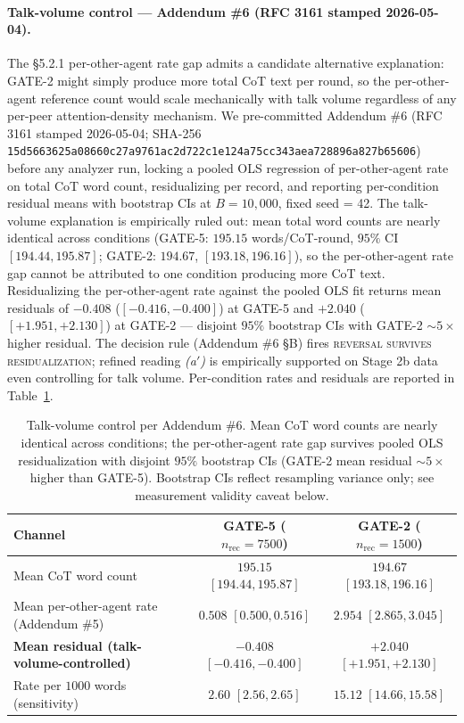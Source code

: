 \paragraph{Talk-volume control --- Addendum \#6 (RFC 3161 stamped 2026-05-04).}
The §5.2.1 per-other-agent rate gap admits a candidate alternative explanation: GATE-2 might simply produce more total CoT text per round, so the per-other-agent reference count would scale mechanically with talk volume regardless of any per-peer attention-density mechanism. We pre-committed Addendum \#6 (RFC 3161 stamped 2026-05-04; SHA-256 \texttt{15d5663625a08660c27a9761ac2d722c1e124a75cc343aea728896a827b65606}) before any analyzer run, locking a pooled OLS regression of per-other-agent rate on total CoT word count, residualizing per record, and reporting per-condition residual means with bootstrap CIs at $B = 10{,}000$, fixed seed = 42. The talk-volume explanation is empirically ruled out: mean total word counts are nearly identical across conditions (GATE-5: $195.15$ words/CoT-round, $95\%$ CI $[194.44, 195.87]$; GATE-2: $194.67$, $[193.18, 196.16]$), so the per-other-agent rate gap cannot be attributed to one condition producing more CoT text. Residualizing the per-other-agent rate against the pooled OLS fit returns mean residuals of $-0.408$ ($[-0.416, -0.400]$) at GATE-5 and $+2.040$ ($[+1.951, +2.130]$) at GATE-2 --- disjoint $95\%$ bootstrap CIs with GATE-2 $\sim 5\times$ higher residual. The decision rule (Addendum \#6 \S B) fires \textsc{reversal survives residualization}; refined reading \emph{(a$'$)} is empirically supported on Stage 2b data even controlling for talk volume. Per-condition rates and residuals are reported in Table~\ref{tab:cot-residualized}.

\begin{table}[h]
\centering
\caption{Talk-volume control per Addendum \#6. Mean CoT word counts are nearly identical across conditions; the per-other-agent rate gap survives pooled OLS residualization with disjoint $95\%$ bootstrap CIs (GATE-2 mean residual $\sim 5\times$ higher than GATE-5). Bootstrap CIs reflect resampling variance only; see measurement validity caveat below.}
\label{tab:cot-residualized}
\begin{tabular}{lcc}
\toprule
Channel & GATE-5 ($n_{\text{rec}} = 7500$) & GATE-2 ($n_{\text{rec}} = 1500$) \\
\midrule
Mean CoT word count & $195.15$ $[194.44, 195.87]$ & $194.67$ $[193.18, 196.16]$ \\
Mean per-other-agent rate (Addendum \#5) & $0.508$ $[0.500, 0.516]$ & $2.954$ $[2.865, 3.045]$ \\
\textbf{Mean residual (talk-volume-controlled)} & $\mathbf{-0.408}$ $\mathbf{[-0.416, -0.400]}$ & $\mathbf{+2.040}$ $\mathbf{[+1.951, +2.130]}$ \\
Rate per $1000$ words (sensitivity) & $2.60$ $[2.56, 2.65]$ & $15.12$ $[14.66, 15.58]$ \\
\bottomrule
\end{tabular}
\end{table}

